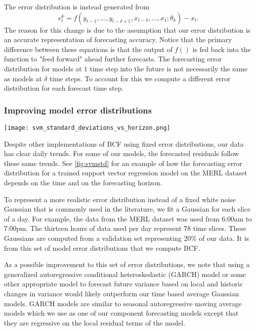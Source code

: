 The error distribution is instead generated from 
\begin{equation}
e_{t}^{k} = f(y_{t - 1}, ..., y_{t - \delta + 1}, x_{t - \delta}, ..., x_{1};\theta_{k}) - x_{t}.
\end{equation}
The reason for this change is due to the assumption that our error distribution is an accurate representation of forecasting accuracy.  Notice that the primary difference between these equations is that the output of $f()$ is fed back into the function to "feed forward" ahead further forecasts.  
The forecasting error distribution for models at $1$ time step into the future is not necessarily the same as models at $\delta$ time steps.  To account for this we compute a different error distribution for each forecast time step.


\subsubsection{Improving model error distributions}

\begin{figure*}[t]
\centering
\texttt{[image: svm\_standard\_deviations\_vs\_horizon.png]}
\caption{Standard deviation of support vector machine residuals for all Wednesdays in MERL dataset.  Time index represents 10 minute intervals from 6:00am to 7:00pm.}
\label{fig:svmstd}
\end{figure*}

Despite other implementations of BCF using fixed error distributions, our data has clear daily trends.  For some of our models, the forecasted residuals follow these same trends.  See \ref{fig:svmstd} for an example of how the forecasting error distribution for a trained support vector regression model on the MERL dataset depends on the time and on the forecasting horizon.

To represent a more realistic error distribution instead of a fixed white noise Gaussian that is commonly used in the literature, we fit a Gaussian for each slice of a day.  For example, the data from the MERL dataset was used from 6:00am to 7:00pm. The thirteen hours of data used per day represent 78 time slices.  These Gaussians are computed from a validation set representing 20\% of our data.  It is from this set of model error distributions that we compute BCF.

As a possible improvement to this set of error distributions, we note that using a generalized autoregressive conditional heteroskedastic (GARCH) model \cite{Box2008} or some other appropriate model to forecast future variance based on local and historic changes in variance would likely outperform our time based average Gaussian models.  GARCH models are similar to seasonal autoregressive moving average models which we use as one of our component forecasting models except that they are regressive on the local residual terms of the model.

